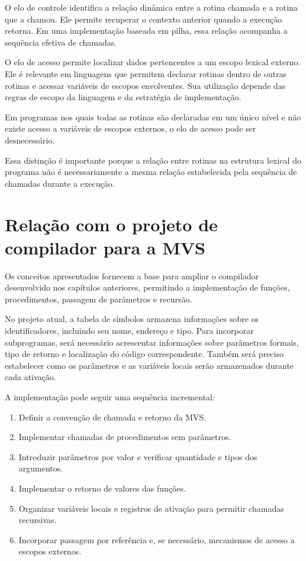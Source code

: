 \documentclass[
  brazilian,
  letterpaper,
]{book}
\providecommand{\tightlist}{%
  \setlength{\itemsep}{0pt}\setlength{\parskip}{0pt}}
\theoremstyle{plain}
\theoremstyle{definition}
\theoremstyle{remark}
\begin{document}
O elo de controle identifica a relação dinâmica entre a rotina chamada e
a rotina que a chamou. Ele permite recuperar o contexto anterior quando
a execução retorna. Em uma implementação baseada em pilha, essa relação
acompanha a sequência efetiva de chamadas.

O elo de acesso permite localizar dados pertencentes a um escopo lexical
externo. Ele é relevante em linguagens que permitem declarar rotinas
dentro de outras rotinas e acessar variáveis de escopos envolventes. Sua
utilização depende das regras de escopo da linguagem e da estratégia de
implementação.

Em programas nos quais todas as rotinas são declaradas em um único nível
e não existe acesso a variáveis de escopos externos, o elo de acesso
pode ser desnecessário.

Essa distinção é importante porque a relação entre rotinas na estrutura
lexical do programa não é necessariamente a mesma relação estabelecida
pela sequência de chamadas durante a execução.

\section{Relação com o projeto de compilador para a
MVS}\label{relauxe7uxe3o-com-o-projeto-de-compilador-para-a-mvs}

Os conceitos apresentados fornecem a base para ampliar o compilador
desenvolvido nos capítulos anteriores, permitindo a implementação de
funções, procedimentos, passagem de parâmetros e recursão.

No projeto atual, a tabela de símbolos armazena informações sobre os
identificadores, incluindo seu nome, endereço e tipo. Para incorporar
subprogramas, será necessário acrescentar informações sobre parâmetros
formais, tipo de retorno e localização do código correspondente. Também
será preciso estabelecer como os parâmetros e as variáveis locais serão
armazenados durante cada ativação.

A implementação pode seguir uma sequência incremental:

\begin{enumerate}
\def\labelenumi{\arabic{enumi}.}
\tightlist
\item
  Definir a convenção de chamada e retorno da MVS.
\item
  Implementar chamadas de procedimentos sem parâmetros.
\item
  Introduzir parâmetros por valor e verificar quantidade e tipos dos
  argumentos.
\item
  Implementar o retorno de valores das funções.
\item
  Organizar variáveis locais e registros de ativação para permitir
  chamadas recursivas.
\item
  Incorporar passagem por referência e, se necessário, mecanismos de
  acesso a escopos externos.
\end{enumerate}
\end{document}
